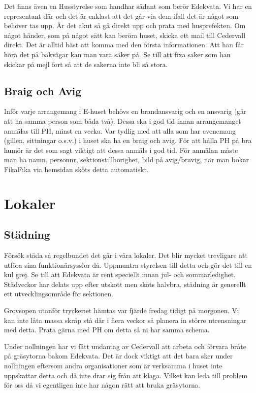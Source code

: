 \documentclass[10pt]{article}
\begin{document}
    Det finns även en Husstyrelse som handhar sådant som berör Edekvata. Vi har en representant där och det är enklast att det går via dem ifall det är något som behöver tas upp. Är det akut så gå direkt upp och prata med husprefekten. Om något händer, som på något sätt kan beröra huset, skicka ett mail till Cedervall direkt. Det är alltid bäst att komma med den första informationen. Att han får höra det på bakvägar kan man vara säker på. Se till att fixa saker som han skickar på mejl fort så att de sakerna inte bli så stora.
    
    \subsection{Braig och Avig}
    
    Inför varje arrangemang i E-huset behövs en brandansvarig och en ansvarig (går att ha samma person som båda två). Dessa ska i god tid innan arrangemanget anmälas till PH, minst en vecka. Var tydlig med att alla som har evenemang (gillen, sittningar o.s.v.) i huset ska ha en braig och avig. För att hålla PH på bra humör är det som sagt viktigt att dessa anmäls i god tid. För anmälan måste man ha namn, personnr, sektionstillhörighet, bild på avig/bravig, när man bokar FikaFika via hemsidan sköts detta automatiskt.
    
    \section{Lokaler}
    
    \subsection{Städning}
    
    Försök städa så regelbundet det går i våra lokaler. Det blir mycket trevligare att utföra sina funktionärsysslor då. Uppmuntra styrelsen till detta och gör det till en kul grej. Se till att Edekvata är rent speciellt innan jul- och sommarledighet. Städveckor har delats upp efter utskott men sköts halvbra, städning är generellt ett utvecklingsområde för sektionen.

    Grovsopen utanför tryckeriet hämtas var fjärde fredag tidigt på morgonen. Vi kan inte låta massa skräp stå där i flera veckor så planera in större utrensningar med detta. Prata gärna med PH om detta så ni har samma schema. 
    
    Under nollningen har vi fått undantag av Cedervall att arbeta och förvara bråte på gräsytorna bakom Edekvata. Det är dock viktigt att det bara sker under nollningen eftersom andra organisationer som är verksamma i huset inte uppskattar detta och då inte drar sig från att klaga. Vilket kan leda till problem för oss då vi egentligen inte har någon rätt att bruka gräsytorna. 
    
\end{document}
